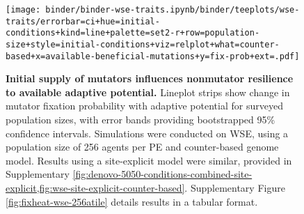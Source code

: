 \begin{figure}[h]
\begin{minipage}{0.6\textwidth}
  \texttt{[image: binder/binder-wse-traits.ipynb/binder/teeplots/wse-traits/errorbar=ci+hue=initial-conditions+kind=line+palette=set2-r+row=population-size+style=initial-conditions+viz=relplot+what=counter-based+x=available-beneficial-mutations+y=fix-prob+ext=.pdf]}%
\end{minipage}%
\begin{minipage}{0.4\textwidth}
  \caption{
  \textbf{Initial supply of mutators influences nonmutator resilience to available adaptive potential.}
  \footnotesize
  Lineplot strips show change in mutator fixation probability with adaptive potential for surveyed population sizes, with error bands providing bootstrapped 95\% confidence intervals.
  Simulations were conducted on WSE, using a population size of 256 agents per PE and counter-based genome model.
  Results using a site-explicit model were similar, provided in Supplementary \cref{fig:denovo-5050-conditions-combined-site-explicit,fig:wse-site-explicit-counter-based}.
  Supplementary Figure \ref{fig:fixheat-wse-256atile} details results in a tabular format.
    }
    \label{fig:denovo-5050-conditions-combined}
  \end{minipage}
\end{figure}
